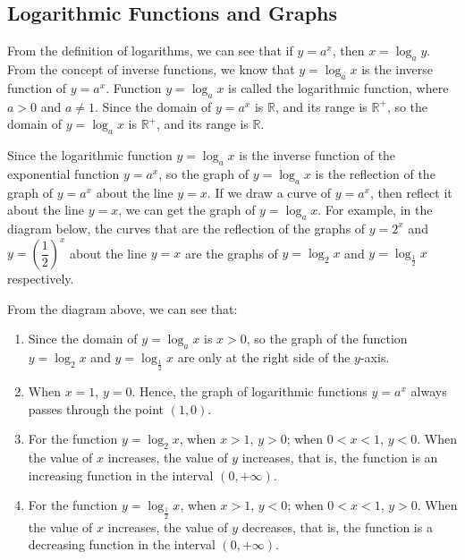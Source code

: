 \documentclass[12pt]{report}
\begin{document}
\subsection*{Logarithmic Functions and Graphs}

From the definition of logarithms, we can see that if $y = a^x$, then $x =
  \log_a y$. From the concept of inverse functions, we know that $y = \log_a x$
is the inverse function of $y = a^x$. Function $y = \log_a x$ is called the
logarithmic function, where $a > 0$ and $a \neq 1$. Since the domain of $y =
  a^x$ is $\mathbb{R}$, and its range is $\mathbb{R}^+$, so the domain of $y =
  \log_a x$ is $\mathbb{R}^+$, and its range is $\mathbb{R}$.

Since the logarithmic function $y = \log_a x$ is the inverse function of the
exponential function $y = a^x$, so the graph of $y = \log_a x$ is the
reflection of the graph of $y = a^x$ about the line $y = x$. If we draw a curve
of $y = a^x$, then reflect it about the line $y = x$, we can get the graph of
$y = \log_a x$. For example, in the diagram below, the curves that are the
reflection of the graphs of $y = 2^x$ and $y = \left(\dfrac{1}{2}\right)^x$
about the line $y = x$ are the graphs of $y = \log_2 x$ and $y =
  \log_\frac{1}{2} x$ respectively.

From the diagram above, we can see that:
\begin{enumerate}[label=(\arabic*)]
  \item Since the domain of $y = \log_a x$ is $x > 0$, so the graph of the function $y
          = \log_2 x$ and $y = \log_\frac{1}{2} x$ are only at the right side of the
        $y$-axis.
  \item When $x = 1$, $y = 0$. Hence, the graph of logarithmic functions $y = a^x$
        always passes through the point $(1, 0)$.

  \item For the function $y = \log_2 x$, when $x > 1$, $y > 0$; when $0 < x < 1$, $y <
          0$. When the value of $x$ increases, the value of $y$ increases, that is, the
        function is an increasing function in the interval $(0, +\infty)$.

  \item For the function $y = \log_\frac{1}{2} x$, when $x > 1$, $y < 0$; when $0 < x <
          1$, $y > 0$. When the value of $x$ increases, the value of $y$ decreases, that
        is, the function is a decreasing function in the interval $(0, +\infty)$.
\end{enumerate}
\end{document}
